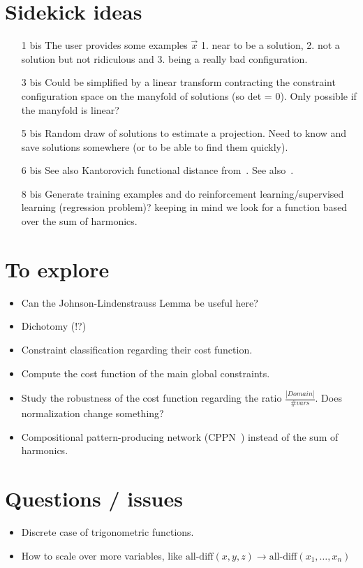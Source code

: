 \documentclass[a4paper, 12pt]{article}
\begin{document}
\section{Sidekick ideas}

\begin{itemize}
\item[1 bis] The user provides some examples $\vec{x}$ 1. near to be a solution, 2. not a solution but not ridiculous and 3. being a really bad configuration.
\item[3 bis] Could be simplified by a linear transform contracting the constraint configuration space on the manyfold of solutions (so det = 0). Only possible if the manyfold is linear?
\item[5 bis] Random draw of solutions to estimate a projection. Need to know and save solutions somewhere (or to be able to find them quickly).
\item [6 bis] See also Kantorovich functional distance from~\cite{StochCP}. See also~\cite{metrics}.
\item [8 bis] Generate training examples and do reinforcement learning/supervised learning (regression problem)? keeping in mind we look for a function based over the sum of harmonics.
\end{itemize}

\section{To explore}
\begin{itemize}
\item Can the Johnson-Lindenstrauss Lemma be useful here?
\item Dichotomy (!?)
\item Constraint classification regarding their cost function.
\item Compute the cost function of the main global constraints.
\item Study the robustness of the cost function regarding the ratio $\frac{|Domain|}{\# vars}$. Does normalization change something?
\item Compositional pattern-producing network (CPPN~\cite{CPPN}) instead of the sum of harmonics.
\end{itemize}

\section{Questions / issues}
\begin{itemize}
\item Discrete case of trigonometric functions.
\item How to scale over more variables, like $\text{all-diff}(x, y, z) \rightarrow \text{all-diff}(x_1, \ldots, x_n)$
\end{itemize}




\end{document}

